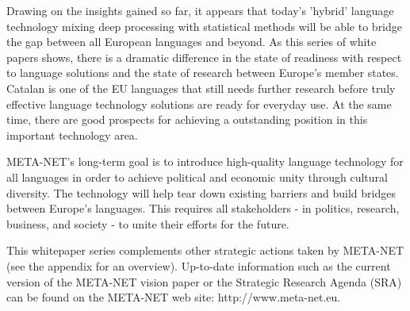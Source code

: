 \documentclass[]{../../metanetpaper}
\begin{document}
\begin{multicols}{2}

    Drawing on the insights gained so far, it appears that today’s 'hybrid' language technology mixing deep processing with statistical methods will be able to bridge the gap between all European languages and beyond. As this series of white papers shows, there is a dramatic difference in the state of readiness with respect to language solutions and the state of research between Europe’s member states. Catalan is one of the EU languages that still needs further research before truly effective language technology solutions are ready for everyday use. At the same time, there are good prospects for achieving a outstanding position in this important technology area. 

    META-NET’s long-term goal is to introduce high-quality language technology for all languages in order to achieve political and economic unity through cultural diversity. The technology will help tear down existing barriers and build bridges between Europe’s languages. This requires all stakeholders - in politics, research, business, and society - to unite their efforts for the future.

    This whitepaper series complements other strategic actions taken by META-NET (see the appendix for an overview). Up-to-date information such as the current version of the META-NET vision paper \cite{Meta1} or the Strategic Research Agenda (SRA) can be found on the META-NET web site: http://www.meta-net.eu.
\end{multicols}

\clearpage


\end{document}
